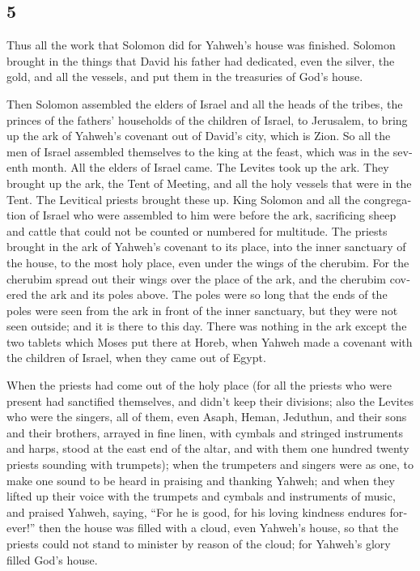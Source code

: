 \begin{paracol}{2}
\switchcolumn
\begin{otherlanguage}{english}

\hypertarget{section-9}{%
\section{5}\label{section-9}}

 Thus all the work that Solomon did for Yahweh's house was
finished. Solomon brought in the things that David his father had
dedicated, even the silver, the gold, and all the vessels, and put them
in the treasuries of God's house.

 Then Solomon assembled the elders of Israel and all the
heads of the tribes, the princes of the fathers' households of the
children of Israel, to Jerusalem, to bring up the ark of Yahweh's
covenant out of David's city, which is Zion.  So all the
men of Israel assembled themselves to the king at the feast, which was
in the seventh month.  All the elders of Israel came. The
Levites took up the ark.  They brought up the ark, the
Tent of Meeting, and all the holy vessels that were in the Tent. The
Levitical priests brought these up.  King Solomon and all
the congregation of Israel who were assembled to him were before the
ark, sacrificing sheep and cattle that could not be counted or numbered
for multitude.  The priests brought in the ark of Yahweh's
covenant to its place, into the inner sanctuary of the house, to the
most holy place, even under the wings of the cherubim. 
For the cherubim spread out their wings over the place of the ark, and
the cherubim covered the ark and its poles above.  The
poles were so long that the ends of the poles were seen from the ark in
front of the inner sanctuary, but they were not seen outside; and it is
there to this day.  There was nothing in the ark except
the two tablets which Moses put there at Horeb, when Yahweh made a
covenant with the children of Israel, when they came out of Egypt.

 When the priests had come out of the holy place (for all
the priests who were present had sanctified themselves, and didn't keep
their divisions;  also the Levites who were the singers,
all of them, even Asaph, Heman, Jeduthun, and their sons and their
brothers, arrayed in fine linen, with cymbals and stringed instruments
and harps, stood at the east end of the altar, and with them one hundred
twenty priests sounding with trumpets);  when the
trumpeters and singers were as one, to make one sound to be heard in
praising and thanking Yahweh; and when they lifted up their voice with
the trumpets and cymbals and instruments of music, and praised Yahweh,
saying, ``For he is good, for his loving kindness endures forever!''
then the house was filled with a cloud, even Yahweh's house,
 so that the priests could not stand to minister by
reason of the cloud; for Yahweh's glory filled God's house.


\end{otherlanguage}
\end{paracol}
